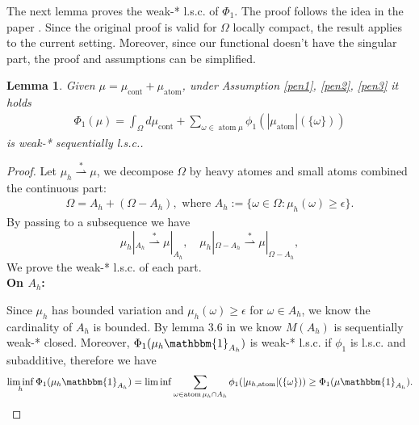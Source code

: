 \documentclass[12pt,fleqn]{amsart}
\newtheorem{lemma}[theorem]{Lemma}
\theoremstyle{definition}
\DeclareMathOperator*{\atom}{atom}
\DeclareMathOperator*{\cont}{cont}
\begin{document}
The next lemma proves the weak-* l.s.c. of $\Phi_1$.
The proof follows the idea in the paper \cite{bouchitte1990new}.
Since the original proof is valid for $\Omega$ locally compact, the result applies to the current setting.
Moreover, since our functional doesn't have the singular part, the proof and assumptions can be simplified.
\begin{lemma} \label{l.s.c.}
Given $\mu = \mu_{\cont} + \mu_{\atom}$, under Assumption \ref{pen1}, \ref{pen2}, \ref{pen3} it holds
\begin{align*}
	\Phi_1(\mu) = \int_\Omega d\mu_{\cont} + \sum_{ \omega \in \atom \mu } \phi_1(|\mu_{\atom}|(\{\omega\}))
\end{align*}
is weak-* sequentially l.s.c..
\end{lemma}
\begin{proof}
	Let $\mu_h \overset{*}{\rightharpoonup} \mu$, we decompose $\Omega$ by heavy atomes and small atoms combined the continuous part:
	\begin{align*}
		\Omega = A_h + (\Omega - A_h), \text{ where } A_h:= \{ \omega \in \Omega: \mu_h(\omega) \ge \epsilon \}.
	\end{align*}
	By passing to a subsequence we have
	\begin{equation*}
		\mu_{h}|_{A_h} \overset{*}{\rightharpoonup} \mu|_{A_h}, \quad
		\mu_{h}|_{\Omega - A_h} \overset{*}{\rightharpoonup} \mu|_{\Omega - A_h},
	\end{equation*}
	We prove the weak-* l.s.c. of each part. \\
	\textbf{On $ A_h $:} \par
	Since $\mu_h$ has bounded variation and $\mu_h(\omega) \ge \epsilon$ for $\omega \in A_h$, we know the cardinality of $A_h$ is bounded.
	By lemma 3.6 in \cite{bouchitte1990new} we know $M(A_h)$ is sequentially weak-* closed.
	Moreover, $\Phi_1(\mu_h \mathbbm{1}_{A_h})$ is weak-* l.s.c. if $\phi_1$ is l.s.c. and subadditive, therefore we have
	\begin{align*}
		\liminf_{h} \Phi_1(\mu_h \mathbbm{1}_{A_h})
		= \liminf  \sum_{ \omega \in \atom \mu_h \cap A_h } \phi_1(|\mu_{h, \atom}|(\{\omega\}))
		\ge \Phi_1 ( \mu \mathbbm{1}_{A_h}).
	\end{align*}


\end{proof}
\end{document}
